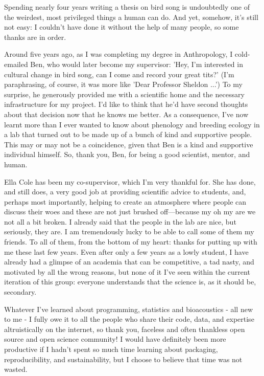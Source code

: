 Spending nearly four years writing a thesis on bird song is undoubtedly one of the weirdest, most privileged things a human can do. And yet, somehow, it's still not easy: I couldn't have done it without the help of many people, so some thanks are in order.

Around five years ago, as I was completing my degree in Anthropology, I cold-emailed Ben, who would later become my supervisor: 'Hey, I'm interested in cultural change in bird song, can I come and record your great tits?' (I'm paraphrasing, of course, it was more like 'Dear Professor Sheldon ...') To my surprise, he generously provided me with a scientific home and the necessary infrastructure for my project. I'd like to think that he'd have second thoughts about that decision now that he knows me better. As a consequence, I've now learnt more than I ever wanted to know about phenology and breeding ecology in a lab that turned out to be made up of a bunch of kind and supportive people. This may or may not be a coincidence, given that Ben is a kind and supportive individual himself. So, thank you, Ben, for being a good scientist, mentor, and human. 

Ella Cole has been my co-supervisor, which I'm very thankful for. She has done, and still does, a very good job at providing scientific advice to students, and, perhaps most importantly, helping to create an atmosphere where people can discuss their woes and these are not just brushed off---because my oh my are we not all a bit broken. I already said that the people in the lab are nice, but seriously, they are. I am tremendously lucky to be able to call some of them my friends. To all of them, from the bottom of my heart: thanks for putting up with me these last few years. Even after only a few years as a lowly student, I have already had a glimpse of an academia that can be competitive, a tad nasty, and motivated by all the wrong reasons, but none of it I've seen within the current iteration of this group: everyone understands that the science is, as it should be, secondary.

Whatever I've learned about programming, statistics and bioacoustics - all new to me - I fully owe it to all the people who share their code, data, and expertise altruistically on the internet, so thank you, faceless and often thankless open source and open science community! I would have definitely been more productive if I hadn't spent so much time learning about packaging, reproducibility, and sustainability, but I choose to believe that time was not wasted.

